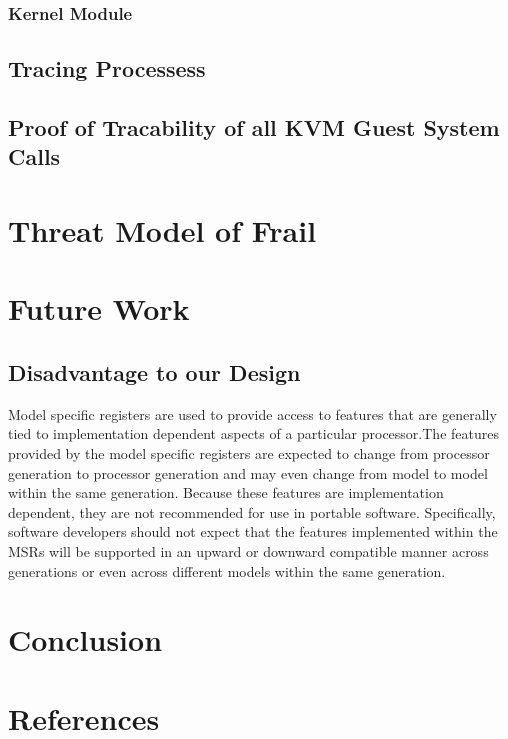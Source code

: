 \documentclass{report}
\begin{document}
\begin{spacing}{1.5}
\subsection{Kernel Module}
\section{Tracing Processess}
\section{Proof of Tracability of all KVM Guest System Calls}

\chapter{Threat Model of Frail}


\chapter{Future Work}


\section{Disadvantage to our Design}

Model specific registers are used to provide access to features that are generally tied to implementation dependent aspects of a particular processor.The features provided by the model specific registers are expected to change from processor
generation to processor generation and may even change from model to model within the same
generation. Because these features are implementation dependent, they are not recommended for
use in portable software. Specifically, software developers should not expect that the features
implemented within the MSRs will be supported in an upward or downward compatible manner
across generations or even across different models within the same generation.

\chapter{Conclusion}

\chapter{References}


\end{spacing}
\end{document}

